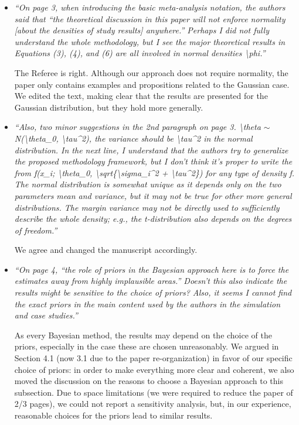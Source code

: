 \documentclass[11pt]{article}
\begin{document}
\begin{itemize}
\item \emph{``On page 3, when introducing the basic meta-analysis notation, the authors said that ``the theoretical discussion in this paper will not enforce normality [about the densities of study results] anywhere.'' Perhaps I did not fully understand the whole methodology, but I see the major theoretical results in Equations (3), (4), and (6) are all involved in normal densities \textbackslash phi.''}

The Referee is right. Although our approach does not require normality, the paper only contains examples and propositions related to the Gaussian case. We edited the text, making clear that the results are presented for the Gaussian distribution, but they hold more generally.



\item \emph{``Also, two minor suggestions in the 2nd paragraph on page 3. \textbackslash theta $\sim$ N(\textbackslash theta\_0, \textbackslash tau\^{}2), the variance should be \textbackslash tau\^{}2 in the normal distribution. In the next line, I understand that the authors try to generalize the proposed methodology framework, but I don't think it's proper to write the from f(x\_i; \textbackslash theta\_0, \textbackslash sqrt\{\textbackslash sigma\_i\^{}2 + \textbackslash tau\^{}2\}) for any type of density f. The normal distribution is somewhat unique as it depends only on the two parameters mean and variance, but it may not be true for other more general distributions. The margin variance may not be directly used to sufficiently describe the whole density; e.g., the t-distribution also depends on the degrees of freedom.''}


We agree and changed the manuscript accordingly.



\item \emph{``On page 4, ``the role of priors in the Bayesian approach here is to force the estimates away from highly implausible areas.'' Doesn't this also indicate the results might be sensitive to the choice of priors? Also, it seems I cannot find the exact priors in the main content used by the authors in the simulation and case studies.''}

As every Bayesian method, the results may depend on the choice of the priors, especially in the case these are chosen unreasonably. We argued in Section 4.1 (now 3.1 due to the paper re-organization) in favor of our specific choice of priors: in order to make everything more clear and coherent, we also moved the discussion on the reasons to choose a Bayesian approach to this subsection.  Due to space limitations (we were required to reduce the paper of 2/3 pages), we could not report a sensitivity analysis, but, in our experience, reasonable choices for the priors lead to similar results.




\end{itemize}
\end{document}
